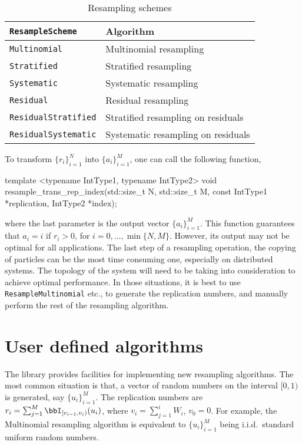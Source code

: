 \begin{table}
  \begin{tabularx}{\textwidth}{lX}
    \toprule
    \verb|ResampleScheme| & Algorithm \\
    \midrule
    \verb|Multinomial|        & Multinomial resampling             \\
    \verb|Stratified|         & Stratified resampling              \\
    \verb|Systematic|         & Systematic resampling              \\
    \verb|Residual|           & Residual resampling                \\
    \verb|ResidualStratified| & Stratified resampling on residuals \\
    \verb|ResidualSystematic| & Systematic resampling on residuals \\
    \bottomrule
  \end{tabularx}
  \caption{Resampling schemes}
  \label{tab:Resampling schemes}
\end{table}

To transform $\{r_i\}_{i=1}^N$ into $\{a_i\}_{i=1}^M$, one can call the
following function,
\begin{cppcode}
  template <typename IntType1, typename IntType2>
  void resample_trans_rep_index(std::size_t N, std::size_t M,
      const IntType1 *replication, IntType2 *index);
\end{cppcode}
where the last parameter is the output vector $\{a_i\}_{i=1}^M$. This function
guarantees that $a_i = i$ if $r_i > 0$, for $i = 0,\dots,\min\{N, M\}$.
However, its output may not be optimal for all applications. The last step of a
resampling operation, the copying of particles can be the most time consuming
one, especially on distributed systems. The topology of the system will need to
be taking into consideration to achieve optimal performance. In those
situations, it is best to use \verb|ResampleMultinomial| etc., to generate the
replication numbers, and manually perform the rest of the resampling algorithm.

\section{User defined algorithms}
\label{sec:User defined algorithms}

The library provides facilities for implementing new resampling algorithms.
The most common situation is that, a vector of random numbers on the interval
$[0, 1)$ is generated, say $\{u_i\}_{i=1}^M$. The replication numbers are $r_i
= \sum_{j=1}^M \bbI_{[v_{i-1},v_i)}(u_i)$, where $v_i = \sum_{j=1}^i W_i$, $v_0
= 0$. For example, the Multinomial resampling algorithm is equivalent to
$\{u_i\}_{i=1}^M$ being i.i.d.\ standard uniform random numbers.


